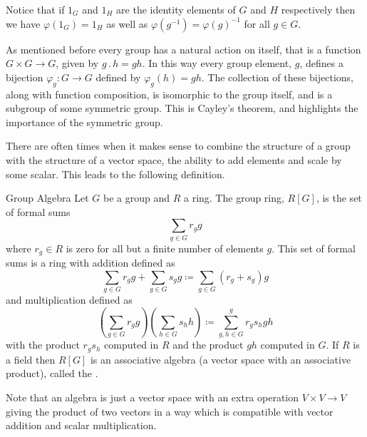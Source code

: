 \documentclass[fleqn]{NotesClass}
\newcommand{\identity}{1}
\newcommand{\action}{\mathbin{.}}
\begin{document}
    Notice that if \(\identity_G\) and \(\identity_H\) are the identity elements of \(G\) and \(H\) respectively then we have \(\varphi(\identity_G) = \identity_H\) as well as \(\varphi(g^{-1}) = \varphi(g)^{-1}\) for all \(g \in G\).
    
    As mentioned before every group has a natural action on itself, that is a function \(G \times G \to G\), given by \(g \action h = gh\).
    In this way every group element, \(g\), defines a bijection \(\varphi_g \colon G \to G\) defined by \(\varphi_g(h) = gh\).
    The collection of these bijections, along with function composition, is isomorphic to the group itself, and is a subgroup of some symmetric group.
    This is Cayley's theorem, and highlights the importance of the symmetric group.
    
    There are often times when it makes sense to combine the structure of a group with the structure of a vector space, the ability to add elements and scale by some scalar.
    This leads to the following definition.
    
    \begin{dfn}{Group Algebra}{}
        Let \(G\) be a group and \(R\) a ring.
        The group ring, \(R[G]\), is the set of formal sums
        \begin{equation}
            \sum_{g \in G} r_g g
        \end{equation}
        where \(r_g \in R\) is zero for all but a finite number of elements \(g\).
        This set of formal sums is a ring with addition defined as
        \begin{equation}
            \sum_{g \in G} r_g g + \sum_{g \in G} s_g g \coloneqq \sum_{g\in G}(r_g + s_g) g
        \end{equation}
        and multiplication defined as
        \begin{equation}
            \left( \sum_{g \in G} r_g g \right) \left( \sum_{h \in G} s_h h \right) \coloneqq \sum_{g, h \in G}^{g} r_g s_h gh
        \end{equation}
        with the product \(r_gs_h\) computed in \(R\) and the product \(gh\) computed in \(G\).
        If \(R\) is a field then \(R[G]\) is an associative algebra (a vector space with an associative product), called the  \cite[740]{hassani}.
    \end{dfn}
    
    Note that an algebra is just a vector space with an extra operation \(V \times V \to V\) giving the product of two vectors in a way which is compatible with vector addition and scalar multiplication.
        
\end{document}
